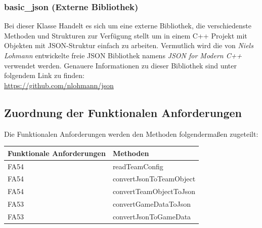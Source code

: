     \subsubsection{basic\_json (Externe Bibliothek)}
		Bei dieser Klasse Handelt es sich um eine externe Bibliothek, die verschiedenste Methoden und Strukturen zur Verfügung stellt um in einem C++ Projekt mit Objekten mit JSON-Struktur einfach zu arbeiten. Vermutlich wird die von \textit{Niels Lohmann} entwickelte freie JSON Bibliothek namens \textit{JSON for Modern C++} verwendet werden. Genauere Informationen zu dieser Bibliothek sind unter folgendem Link zu finden: \\ \url{https://github.com/nlohmann/json}

\subsection{Zuordnung der Funktionalen Anforderungen}

Die Funktionalen Anforderungen werden den Methoden folgendermaßen zugeteilt:


\begin{table}[h]
	\centering
	\begin{tabular}{|l|l|}
    	\hline
    	\textbf{Funktionale Anforderungen} & \textbf{Methoden} \\ \hline
    	FA54 & readTeamConfig \\ \hline
    	FA54 & convertJsonToTeamObject \\ \hline
    	FA54 & convertTeamObjectToJson \\ \hline
    	FA53 & convertGameDataToJson \\ \hline
    	FA53 & convertJsonToGameData \\ \hline

	\end{tabular}
\end{table}